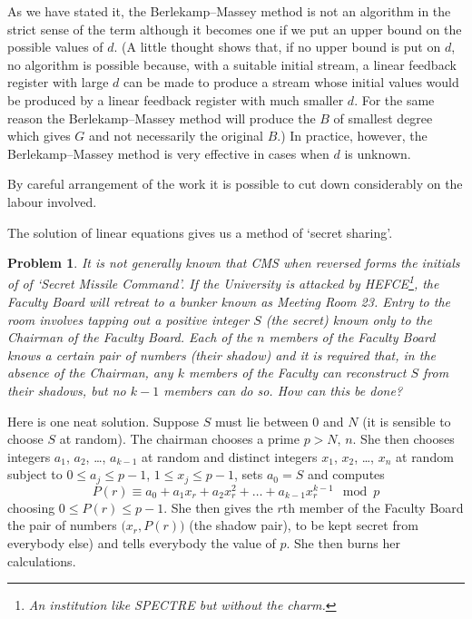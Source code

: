 \documentclass[12pt,a4paper]{article}
\theoremstyle{plain}
\newtheorem{problem}[theorem]{Problem}
\theoremstyle{definition}
\begin{document}
    As we have stated it, the Berlekamp--Massey method
    is not an algorithm in the strict sense
    of the term although it becomes one if we put an
    upper bound on the possible values of $d$. (A little
    thought shows that, if no upper bound is put on $d$,
    no algorithm is possible because, with a suitable
    initial stream, a linear feedback register with
    large $d$ can be made to produce a stream whose
    initial values would be produced by
    a linear feedback register with much smaller $d$.
    For the same reason the Berlekamp--Massey method
    will produce the $B$ of smallest degree which
    gives $G$ and not necessarily the original $B$.)
    In practice, however, the Berlekamp--Massey method
    is very effective in cases when $d$ is unknown.

    By careful arrangement of the work it is possible
    to cut down considerably on the labour involved.

    The solution of linear equations gives us
    a method of `secret sharing'\label{P;secret sharing}.
    \begin{problem}
        It is not generally known that
        CMS when reversed forms the initials of
        of `Secret Missile Command'. If the University is
        attacked by HEFCE\footnote{An institution like
        SPECTRE but without the charm.}, the Faculty Board
        will retreat to a bunker known as
        Meeting Room 23. Entry to the room involves
        tapping out a positive integer $S$ (the secret)
        known only to the Chairman of the Faculty Board.
        Each of the $n$ members of the Faculty Board
        knows a certain pair of numbers (their shadow)
        and it is required that, in the absence
        of the Chairman, any $k$ members of the
        Faculty can reconstruct $S$ from their shadows,
        but no $k-1$ members can do so. How can this
        be done?
    \end{problem}

    Here is one neat solution. Suppose $S$ must lie between
    $0$ and $N$ (it is sensible to choose $S$ at random).
    The chairman chooses
    a prime $p>N,\,n$. She then chooses integers
    $a_{1}$, $a_{2}$, \dots, $a_{k-1}$ at random
    and distinct integers
    $x_{1}$, $x_{2}$, \dots, $x_{n}$ at random
    subject to $0\leq a_{j}\leq p-1$,
    $1\leq x_{j}\leq p-1$, sets $a_{0}=S$
    and computes
    \[P(r)\equiv a_{0}+a_{1}x_{r}+a_{2}x_{r}^{2}+\dots+a_{k-1}x_{r}^{k-1}\mod{p}\]
    choosing $0\leq P(r)\leq p-1$.
    She then gives the $r$th member of the Faculty Board
    the pair of numbers $\big(x_{r},P(r)\big)$ (the shadow pair),
    to be kept secret
    from everybody else) and tells everybody the value of $p$.
    She then burns her calculations.
\end{document}
